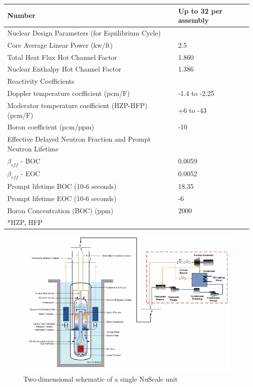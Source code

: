 \documentclass[10pt,a4paper]{article}
\begin{document}
\begin{table} [htbp]
\begin{center}
\begin{tabular}{l     l}
Number &Up to 32 per assembly\\
\hline 
Nuclear Design Parameters (for Equilibrium Cycle)\\
Core Average Linear Power (kw/ft)&2.5     \\
Total Heat Flux Hot Channel Factor&1.860  \\
Nuclear Enthalpy Hot Channel Factor&1.386  \\
\hline 
Reactivity Coefficients\\
Doppler temperature coefficient (pcm/F)&-1.4 to -2.25\\
Moderator temperature coefficient (HZP-HFP) (pcm/F)&+6 to -43     \\
Boron coefficient (pcm/ppm)&-10             \\
\hline 
Effective Delayed Neutron Fraction 
and Prompt Neutron Lifetime\\
$\beta_{eff}$ - \gls{BOC}&0.0059\\
$ \beta _{eff}$ - \gls{EOC}&0.0052\\
Prompt lifetime BOC (10-6 seconds)&18.35  \\
Prompt lifetime EOC (10-6 seconds)&-6       \\
\hline 
Boron Concentration (BOC) (ppm)&2000\\
\hline 
*\gls{HZP}, \gls{HFP}
\end{tabular}
\end{center}
\end{table}


\begin{figure}[htbp]
\centering
\includegraphics[scale=0.7]{Figs/nuscale2d.jpeg}
\caption{ Two-dimensional schematic of a single NuScale unit}
\label{Nu2d}
\end{figure}
\end{document}
